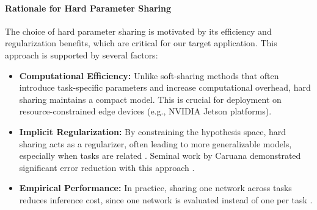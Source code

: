 \paragraph*{Rationale for Hard Parameter Sharing}
The choice of hard parameter sharing is motivated by its efficiency and regularization benefits, which are critical for our target application. This approach is supported by several factors:
\begin{itemize}
    \item \textbf{Computational Efficiency:} Unlike soft-sharing methods that often introduce task-specific parameters and increase computational overhead, hard sharing maintains a compact model. This is crucial for deployment on resource-constrained edge devices (e.g., NVIDIA Jetson platforms).
    \item \textbf{Implicit Regularization:} By constraining the hypothesis space, hard sharing acts as a regularizer, often leading to more generalizable models, especially when tasks are related \cite{baxter2000model}. Seminal work by Caruana demonstrated significant error reduction with this approach \cite{caruana1997multitask}.
    \item \textbf{Empirical Performance:} In practice, sharing one network across tasks reduces
    inference cost, since one network is evaluated instead of one per
    task \cite{standley2020tasks}.
\end{itemize}

